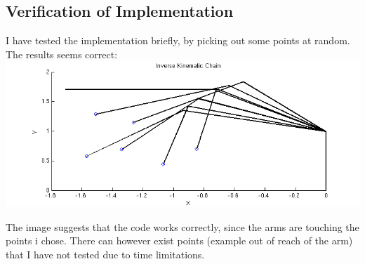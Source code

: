 \documentclass[10pt,oneside,a4paper,final,english]{memoir}
\begin{document}
\subsection*{Verification of Implementation}
I have tested the implementation briefly, by picking out some points
at random. The results seems correct:\\
\includegraphics[scale=.7]{shot.png}

The image suggests that the code works correctly, since the arms are
touching the points i chose. There can however exist points (example
out of reach of the arm) that I have not tested due to time
limitations.
\end{document}

